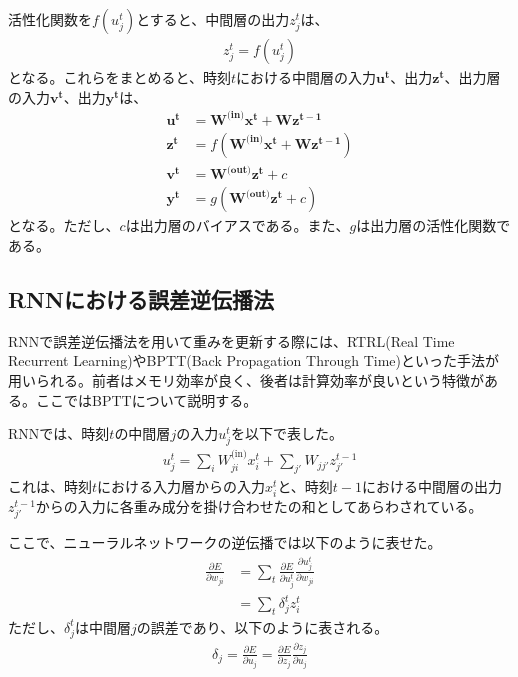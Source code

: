 \documentclass{ltjsarticle}
\begin{document}
活性化関数を$f(u^t_j)$とすると、中間層の出力$z^t_j$は、
\begin{align}
  z^t_j = f(u^t_j)
\end{align}
となる。これらをまとめると、時刻$t$における中間層の入力$\mathbf{u^t}$、出力$\mathbf{z^t}$、出力層の入力$\mathbf{v^t}$、出力$\mathbf{y^t}$は、
\begin{align}
  \mathbf{u^t} &= \mathbf{W^{\text{(in)}}}\mathbf{x^t} + \mathbf{Wz^{t-1}}\\
  \mathbf{z^t} &= f(\mathbf{W^{\text{(in)}}}\mathbf{x^t} + \mathbf{Wz^{t-1}})\\
  \mathbf{v^t} &= \mathbf{W^{\text{(out)}}}\mathbf{z^t} + c\\
  \mathbf{y^t} &= g(\mathbf{W^{\text{(out)}}}\mathbf{z^t} + c)
\end{align}
となる。ただし、$c$は出力層のバイアスである。また、$g$は出力層の活性化関数である。



\subsection{RNNにおける誤差逆伝播法}
RNNで誤差逆伝播法を用いて重みを更新する際には、RTRL(Real Time Recurrent Learning)やBPTT(Back Propagation Through Time)といった手法が用いられる。前者はメモリ効率が良く、後者は計算効率が良いという特徴がある。ここではBPTTについて説明する。

RNNでは、時刻$t$の中間層$j$の入力$u_j^t$を以下で表した。
\begin{align}
  u_j^t = \sum_i W_{ji}^{\text{(in)}}x_i^t + \sum_{j'} W_{jj'}z_{j'}^{t-1}
\end{align}
これは、時刻$t$における入力層からの入力$x_i^t$と、時刻$t-1$における中間層の出力$z_{j'}^{t-1}$からの入力に各重み成分を掛け合わせたの和としてあらわされている。

ここで、ニューラルネットワークの逆伝播では以下のように表せた。
\begin{align}
  \frac{\partial E}{\partial w_{ji}} &= \sum_t \frac{\partial E}{\partial u_j^t} \frac{\partial u_j^t}{\partial w_{ji}}\\
  &= \sum_t \delta_j^t z_i^t
\end{align}
ただし、$\delta_j^t$は中間層$j$の誤差であり、以下のように表される。
\begin{align}
  \delta_j = \frac{\partial E}{\partial u_j} = \frac{\partial E}{\partial z_j} \frac{\partial z_j}{\partial u_j}
\end{align}
\end{document}

